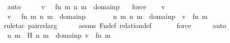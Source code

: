 \begin{isabellebody}
\ auto\isanewline
\ \ \isamarkupfalse%
\ \isamarkupfalse%
\ {\isachardoublequoteopen}v\ {\isasymin}\ {\isacharbraceleft}{\kern0pt}\ {\isacharless}{\kern0pt}f{\isacharbackquote}{\kern0pt}n{\isacharcomma}{\kern0pt}\ m{\isachargreater}{\kern0pt}{\isachardot}{\kern0pt}\ {\isacharless}{\kern0pt}n{\isacharcomma}{\kern0pt}\ m{\isachargreater}{\kern0pt}\ {\isasymin}\ domain{\isacharparenleft}{\kern0pt}p{\isacharparenright}{\kern0pt}\ {\isacharbraceright}{\kern0pt}{\isachardoublequoteclose}\ \isamarkupfalse%
\ force\isanewline
{}\isamarkupfalse%
\isanewline
\ \ \isamarkupfalse%
\ v\ \isamarkupfalse%
\ {\isachardoublequoteopen}v\ {\isasymin}\ {\isacharbraceleft}{\kern0pt}\ {\isacharless}{\kern0pt}f{\isacharbackquote}{\kern0pt}n{\isacharcomma}{\kern0pt}\ m{\isachargreater}{\kern0pt}{\isachardot}{\kern0pt}\ {\isacharless}{\kern0pt}n{\isacharcomma}{\kern0pt}\ m{\isachargreater}{\kern0pt}\ {\isasymin}\ domain{\isacharparenleft}{\kern0pt}p{\isacharparenright}{\kern0pt}\ {\isacharbraceright}{\kern0pt}{\isachardoublequoteclose}\ \isanewline
\ \ \isamarkupfalse%
\ \isamarkupfalse%
\ {\isachardoublequoteopen}{\isasymexists}n\ m{\isachardot}{\kern0pt}\ {\isasymlangle}n{\isacharcomma}{\kern0pt}\ m{\isasymrangle}\ {\isasymin}\ domain{\isacharparenleft}{\kern0pt}p{\isacharparenright}{\kern0pt}\ {\isasymand}\ v\ {\isacharequal}{\kern0pt}\ {\isacharless}{\kern0pt}f{\isacharbackquote}{\kern0pt}n{\isacharcomma}{\kern0pt}\ m{\isachargreater}{\kern0pt}{\isachardoublequoteclose}\ \ \isanewline
\ \ \ \ \isamarkupfalse%
{\isacharparenleft}{\kern0pt}rule{\isacharunderscore}{\kern0pt}tac\ pair{\isacharunderscore}{\kern0pt}rel{\isacharunderscore}{\kern0pt}arg{\isacharparenright}{\kern0pt}\isanewline
\ \ \ \ \isamarkupfalse%
\ assms\ Fn{\isacharunderscore}{\kern0pt}def\ relation{\isacharunderscore}{\kern0pt}def\isanewline
\ \ \ \ \ \isamarkupfalse%
\ force\isanewline
\ \ \ \ \isamarkupfalse%
\ auto\isanewline
\ \ \isamarkupfalse%
\ \isamarkupfalse%
\ n\ m\ \ H{\isacharcolon}{\kern0pt}\ {\isachardoublequoteopen}{\isacharless}{\kern0pt}n{\isacharcomma}{\kern0pt}\ m{\isachargreater}{\kern0pt}\ {\isasymin}\ domain{\isacharparenleft}{\kern0pt}p{\isacharparenright}{\kern0pt}{\isachardoublequoteclose}\ {\isachardoublequoteopen}v\ {\isacharequal}{\kern0pt}\ {\isacharless}{\kern0pt}f{\isacharbackquote}{\kern0pt}n{\isacharcomma}{\kern0pt}\ m{\isachargreater}{\kern0pt}{\isachardoublequoteclose}\ \isamarkupfalse%

\end{isabellebody}
